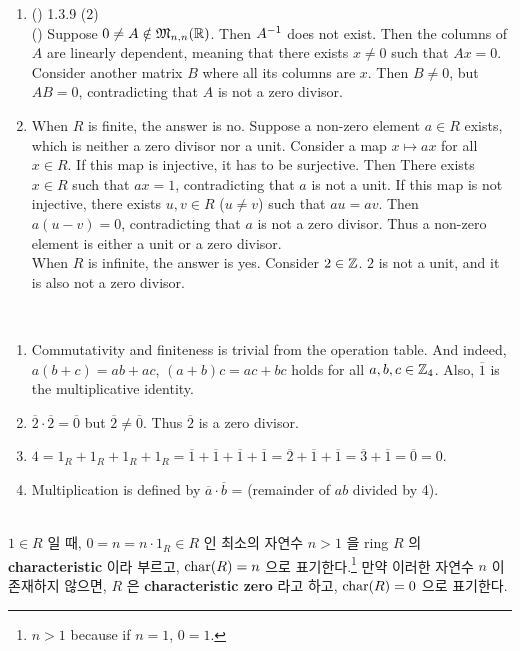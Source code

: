 \begin{enumerate}
	\item (\mimp) 1.3.9 (2)\\
	(\mimpb) Suppose $0\neq A\notin \mathfrak{M}_{n, n}(\mathbb{R})$. Then $A^{-1}$ does not exist. Then the columns of $A$ are linearly dependent, meaning that there exists $x\neq 0$ such that $Ax=0$. Consider another matrix $B$ where all its columns are $x$. Then $B\neq 0$, but $AB = 0$, contradicting that $A$ is not a zero divisor.
	\item When $R$ is finite, the answer is no. Suppose a non-zero element $a\in R$ exists, which is neither a zero divisor nor a unit. Consider a map $x\mapsto ax$ for all $x\in R$. If this map is injective, it has to be surjective. Then There exists $x\in R$ such that $ax = 1$, contradicting that $a$ is not a unit. If this map is not injective, there exists $u, v\in R$ ($u\neq v$) such that $au = av$. Then $a(u-v) = 0$, contradicting that $a$ is not a zero divisor. Thus a non-zero element is either a unit or a zero divisor.\\
	When $R$ is infinite, the answer is yes. Consider $2\in \mathbb{Z}$. $2$ is not a unit, and it is also not a zero divisor. 
\end{enumerate}~
\\
\begin{enumerate}
	\item Commutativity and finiteness is trivial from the operation table. And indeed, $a(b+c)=ab+ac$, $(a+b)c = ac+bc$ holds for all $a, b, c\in \mathbb{Z}_4$. Also, $\overline{1}$ is the multiplicative identity.
	\item $\overline{2}\cdot \overline{2} = \overline{0}$ but $\overline{2} \neq \overline{0}$. Thus $\overline{2}$ is a zero divisor.
	\item $4 = 1_R + 1_R + 1_R + 1_R = \overline{1} + \overline{1} + \overline{1} +\overline{1} = \overline{2} + \overline{1} + \overline{1} = \overline{3} + \overline{1} = \overline{0} = 0$.
	\item Multiplication is defined by $\overline{a}\cdot \overline{b}$ = (remainder of $ab$ divided by 4).
\end{enumerate}~
\\
 $1\in R$ 일 때, $0=n=n\cdot 1_R \in R$ 인 최소의 자연수 $n > 1$ 을 ring $R$ 의 \textbf{characteristic} 이라 부르고, $\operatorname{char}(R) = n$ 으로 표기한다.\footnote{$n>1$ because if $n = 1$, $0=1$.} 만약 이러한 자연수 $n$ 이 존재하지 않으면, $R$ 은 \textbf{characteristic zero} 라고 하고, $\operatorname{char}(R) = 0$ 으로 표기한다.\\
